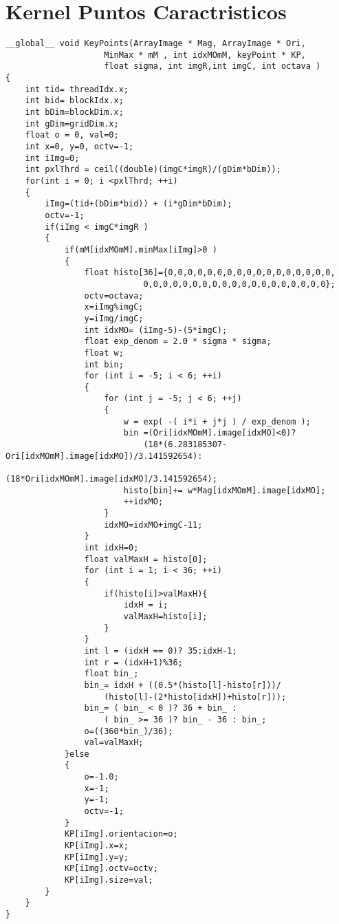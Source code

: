 \chapter{Kernel Puntos Caractristicos}
\begin{small}
\lstset{tabsize=2, frame=none}
\begin{lstlisting}
__global__ void KeyPoints(ArrayImage * Mag, ArrayImage * Ori,
					MinMax * mM , int idxMOmM, keyPoint * KP, 
					float sigma, int imgR,int imgC, int octava )
{
	int tid= threadIdx.x;
	int bid= blockIdx.x;
	int bDim=blockDim.x;
	int gDim=gridDim.x;
	float o = 0, val=0;
	int x=0, y=0, octv=-1;
	int iImg=0;
	int pxlThrd = ceil((double)(imgC*imgR)/(gDim*bDim)); 
	for(int i = 0; i <pxlThrd; ++i)
	{
		iImg=(tid+(bDim*bid)) + (i*gDim*bDim); 
		octv=-1;
		if(iImg < imgC*imgR )
		{
			if(mM[idxMOmM].minMax[iImg]>0 )
			{
				float histo[36]={0,0,0,0,0,0,0,0,0,0,0,0,0,0,0,0,0,
							0,0,0,0,0,0,0,0,0,0,0,0,0,0,0,0,0,0,0};
				octv=octava;
				x=iImg%imgC;
				y=iImg/imgC;
				int idxMO= (iImg-5)-(5*imgC);
				float exp_denom = 2.0 * sigma * sigma;
				float w;
				int bin;
				for (int i = -5; i < 6; ++i)
				{
					for (int j = -5; j < 6; ++j)
					{
						w = exp( -( i*i + j*j ) / exp_denom );
						bin =(Ori[idxMOmM].image[idxMO]<0)?
							(18*(6.283185307-Ori[idxMOmM].image[idxMO])/3.141592654):
							(18*Ori[idxMOmM].image[idxMO]/3.141592654);
						histo[bin]+= w*Mag[idxMOmM].image[idxMO];
						++idxMO;
					}
					idxMO=idxMO+imgC-11;
				}
				int idxH=0;
				float valMaxH = histo[0];
				for (int i = 1; i < 36; ++i)
				{	
					if(histo[i]>valMaxH){
						idxH = i;
						valMaxH=histo[i]; 
					}
				}
				int l = (idxH == 0)? 35:idxH-1;
				int r = (idxH+1)%36;
				float bin_;
				bin_= idxH + ((0.5*(histo[l]-histo[r]))/
					(histo[l]-(2*histo[idxH])+histo[r]));
				bin_= ( bin_ < 0 )? 36 + bin_ :
					( bin_ >= 36 )? bin_ - 36 : bin_;
				o=((360*bin_)/36);
				val=valMaxH; 
			}else
			{
				o=-1.0;
				x=-1;
				y=-1;
				octv=-1;
			}
			KP[iImg].orientacion=o;
			KP[iImg].x=x;
			KP[iImg].y=y;
			KP[iImg].octv=octv;
			KP[iImg].size=val;
		}
	}
}
\end{lstlisting}


\end{small}

